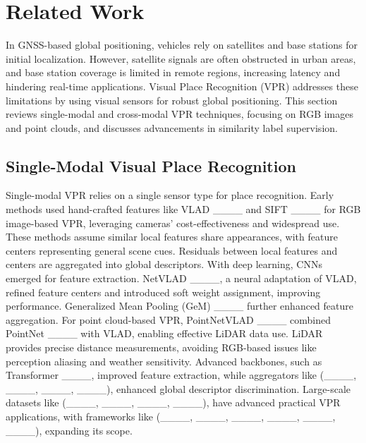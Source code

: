 \section{Related Work}
In GNSS-based global positioning, vehicles rely on satellites and base stations for initial localization. However, satellite signals are often obstructed in urban areas, and base station coverage is limited in remote regions, increasing latency and hindering real-time applications. Visual Place Recognition (VPR) addresses these limitations by using visual sensors for robust global positioning. This section reviews single-modal and cross-modal VPR techniques, focusing on RGB images and point clouds, and discusses advancements in similarity label supervision.

\subsection{Single-Modal Visual Place Recognition}
Single-modal VPR relies on a single sensor type for place recognition. Early methods used hand-crafted features like VLAD ____ and SIFT ____ for RGB image-based VPR, leveraging cameras' cost-effectiveness and widespread use. These methods assume similar local features share appearances, with feature centers representing general scene cues. Residuals between local features and centers are aggregated into global descriptors. With deep learning, CNNs emerged for feature extraction. NetVLAD ____, a neural adaptation of VLAD, refined feature centers and introduced soft weight assignment, improving performance. Generalized Mean Pooling (GeM) ____ further enhanced feature aggregation. For point cloud-based VPR, PointNetVLAD ____ combined PointNet ____ with VLAD, enabling effective LiDAR data use. LiDAR provides precise distance measurements, avoiding RGB-based issues like perception aliasing and weather sensitivity. Advanced backbones, such as Transformer ____, improved feature extraction, while aggregators like (____, ____, ____, ____), enhanced global descriptor discrimination. Large-scale datasets like (____, ____, ____, ____), have advanced practical VPR applications, with frameworks like (____, ____, ____, ____, ____, ____), expanding its scope.

